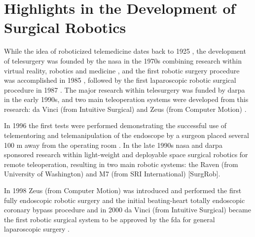 \section{Highlights in the Development of Surgical Robotics}
While the idea of roboticized telemedicine dates back to 1925 \citep{bib:telemed_predict}, the development of telesurgery was founded by the \gls{nasa} in the 1970s \citep{bib:telesurg_history} combining research within virtual reality, robotics and medicine \citep{bib:brown_univ}, and the first robotic surgery procedure was accomplished in 1985 \citep{bib:telesurg_history}, followed by the first laparoscopic robotic surgical procedure in 1987 \citep{bib:brown_univ}.
The major research within telesurgery was funded by \gls{darpa} in the early 1990s, and two main teleoperation systems were developed from this research: da Vinci (from Intuitive Surgical) and Zeus (from Computer Motion) \citep{bib:telesurg_history}.



In 1996 the first tests were performed demonstrating the successful use of telementoring and telemanipulation of the endoscope by a surgeon placed several 100 m away from the operating room \citep{bib:telesurg_history}. 
In the late 1990s \gls{nasa} and \gls{darpa} sponsored research within light-weight and deployable space surgical robotics for remote teleoperation, resulting in two main robotic systems: the Raven (from University of Washington) and M7 (from SRI International) [SurgRob].

In 1998 Zeus (from Computer Motion) was introduced and performed the first fully endoscopic robotic surgery and the initial beating-heart totally endoscopic coronary bypass procedure \citep{bib:brown_univ} and in 2000 da Vinci (from Intuitive Surgical) became the first robotic surgical system  to be approved by the \gls{fda} for general laparoscopic surgery \citep{bib:mddi}.

